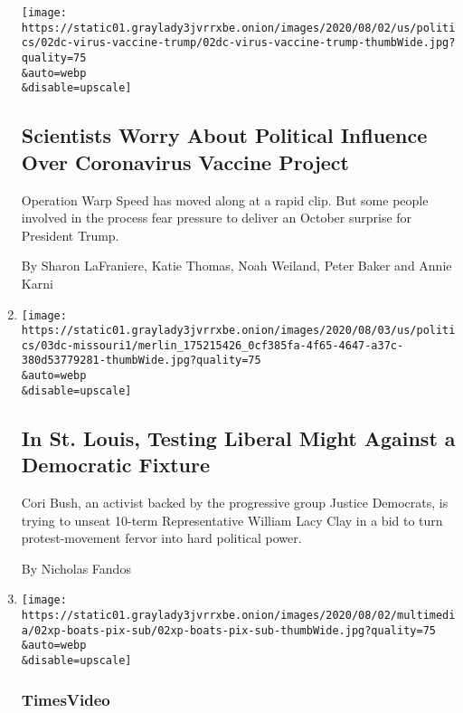\begin{enumerate}
  \texttt{[image: https://static01.graylady3jvrrxbe.onion/images/2020/08/02/us/politics/02dc-virus-vaccine-trump/02dc-virus-vaccine-trump-thumbWide.jpg?quality=75\\\&auto=webp\\\&disable=upscale]}

  \hypertarget{scientists-worry-about-political-influence-over-coronavirus-vaccine-project}{%
  \subsection{Scientists Worry About Political Influence Over
  Coronavirus Vaccine
  Project}\label{scientists-worry-about-political-influence-over-coronavirus-vaccine-project}}

  Operation Warp Speed has moved along at a rapid clip. But some people
  involved in the process fear pressure to deliver an October surprise
  for President Trump.

  By Sharon LaFraniere, Katie Thomas, Noah Weiland, Peter Baker and
  Annie Karni
\item
  \href{/2020/08/02/us/politics/cori-bush-william-lacy-clay-missouri.html}{}

  \texttt{[image: https://static01.graylady3jvrrxbe.onion/images/2020/08/03/us/politics/03dc-missouri1/merlin\_175215426\_0cf385fa-4f65-4647-a37c-380d53779281-thumbWide.jpg?quality=75\\\&auto=webp\\\&disable=upscale]}

  \hypertarget{in-st-louis-testing-liberal-might-against-a-democratic-fixture}{%
  \subsection{In St. Louis, Testing Liberal Might Against a Democratic
  Fixture}\label{in-st-louis-testing-liberal-might-against-a-democratic-fixture}}

  Cori Bush, an activist backed by the progressive group Justice
  Democrats, is trying to unseat 10-term Representative William Lacy
  Clay in a bid to turn protest-movement fervor into hard political
  power.

  By Nicholas Fandos
\item
  \href{/video/us/100000007269193/boats-circle-spacex-capsule.html}{}

  \texttt{[image: https://static01.graylady3jvrrxbe.onion/images/2020/08/02/multimedia/02xp-boats-pix-sub/02xp-boats-pix-sub-thumbWide.jpg?quality=75\\\&auto=webp\\\&disable=upscale]}

  \hypertarget{timesvideo}{%
  \subsubsection{TimesVideo}\label{timesvideo}}


\end{enumerate}
